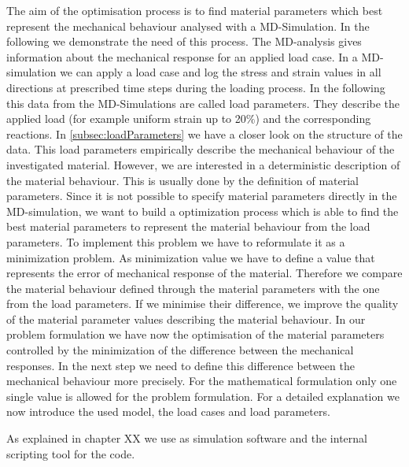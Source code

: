     The aim of the optimisation process is to find material parameters which best represent the mechanical behaviour analysed with a MD-Simulation. In the following we demonstrate the need of this process.
    The MD-analysis gives information about the mechanical response for an applied load case. In a MD-simulation we can apply a load case and log the stress and strain values in all directions at prescribed time steps during the loading process. In the following this data from the MD-Simulations are called load parameters. They describe the applied load (for example uniform strain up to 20\(\%\)) and the corresponding reactions. In \autoref{subsec:loadParameters} we have a closer look on the structure of the data. 
    This load parameters empirically describe the mechanical behaviour of the investigated material. However, we are interested in a deterministic description of the material behaviour. This is usually done by the definition of material parameters. Since it is not possible to specify material parameters directly in the MD-simulation, we want to build a optimization process which is able to find the best material parameters to represent the material behaviour from the load parameters. To implement this problem we have to reformulate it as a minimization problem. As minimization value we have to define a value that represents the error of mechanical response of the material. Therefore we compare the material behaviour defined through the material parameters with the one from the load parameters. If we minimise their difference, we improve the quality of the material parameter values describing the material behaviour. In our problem formulation we have now the optimisation of the material parameters controlled by the minimization of the difference between the mechanical responses. In the next step we need to define this difference between the mechanical behaviour more precisely. For the mathematical formulation only one single value is allowed for the problem formulation. For a detailed explanation we now introduce the used model, the load cases and load parameters.

    As explained in chapter XX we use  as simulation software and the  internal scripting tool for the code. 
    
    
